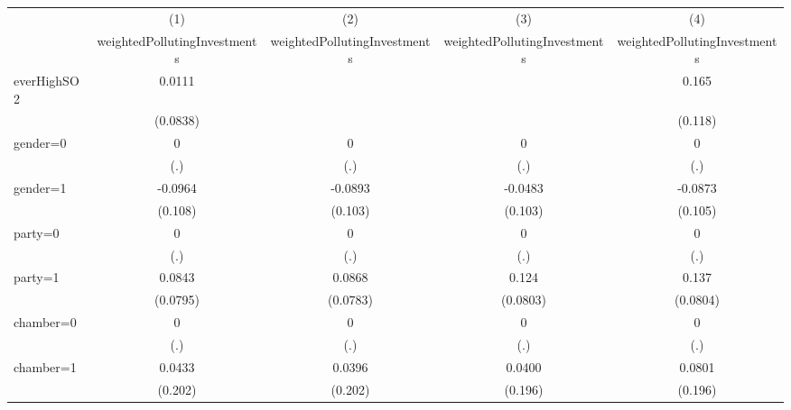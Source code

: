 {
\def\sym#1{\ifmmode^{#1}\else\(^{#1}\)\fi}
\begin{tabular}{l*{4}{c}}
\toprule
                    &\multicolumn{1}{c}{(1)}&\multicolumn{1}{c}{(2)}&\multicolumn{1}{c}{(3)}&\multicolumn{1}{c}{(4)}\\
                    &\multicolumn{1}{c}{weightedPollutingInvestments}&\multicolumn{1}{c}{weightedPollutingInvestments}&\multicolumn{1}{c}{weightedPollutingInvestments}&\multicolumn{1}{c}{weightedPollutingInvestments}\\
\midrule
everHighSO2         &      0.0111         &                     &                     &       0.165         \\
                    &    (0.0838)         &                     &                     &     (0.118)         \\
\addlinespace
gender=0            &           0         &           0         &           0         &           0         \\
                    &         (.)         &         (.)         &         (.)         &         (.)         \\
\addlinespace
gender=1            &     -0.0964         &     -0.0893         &     -0.0483         &     -0.0873         \\
                    &     (0.108)         &     (0.103)         &     (0.103)         &     (0.105)         \\
\addlinespace
party=0             &           0         &           0         &           0         &           0         \\
                    &         (.)         &         (.)         &         (.)         &         (.)         \\
\addlinespace
party=1             &      0.0843         &      0.0868         &       0.124         &       0.137         \\
                    &    (0.0795)         &    (0.0783)         &    (0.0803)         &    (0.0804)         \\
\addlinespace
chamber=0           &           0         &           0         &           0         &           0         \\
                    &         (.)         &         (.)         &         (.)         &         (.)         \\
\addlinespace
chamber=1           &      0.0433         &      0.0396         &      0.0400         &      0.0801         \\
                    &     (0.202)         &     (0.202)         &     (0.196)         &     (0.196)         \\

\end{tabular}}
